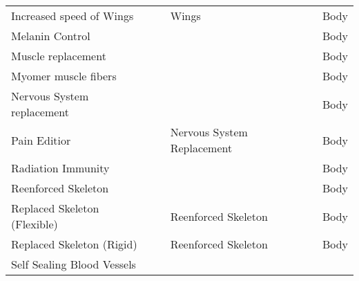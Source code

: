 \documentclass[twoside]{book}
\begin{document}
\begin{longtable}{p{1.25in}p{2em}ll}
  \raggedright
           Increased speed of Wings
           
  &
  
  &
   Wings 
  &
   Body 
  \tabularnewline
      
  \raggedright
           Melanin Control 
  &
  
  &
  
  &
   Body 
  \tabularnewline
      
  \raggedright
           Muscle replacement 
  &
  
  &
  
  &
   Body 
  \tabularnewline
      
  \raggedright
           Myomer muscle fibers 
  &
  
  &
  
  &
   Body 
  \tabularnewline
      
  \raggedright
           Nervous System replacement
           
  &
  
  &
  
  &
   Body 
  \tabularnewline
      
  \raggedright
           Pain Editior 
  &
  
  &
   Nervous System
           Replacement 
  &
   Body 
  \tabularnewline
      
  \raggedright
           Radiation Immunity 
  &
  
  &
  
  &
   Body 
  \tabularnewline
      
  \raggedright
           Reenforced Skeleton 
  &
  
  &
  
  &
   Body 
  \tabularnewline
      
  \raggedright
           Replaced Skeleton (Flexible)
           
  &
  
  &
   Reenforced Skeleton
           
  &
   Body 
  \tabularnewline
      
  \raggedright
           Replaced Skeleton (Rigid)
           
  &
  
  &
   Reenforced Skeleton
           
  &
   Body 
  \tabularnewline
      
  \raggedright
           Self Sealing Blood Vessels
           
  &
  
  &
  

\end{longtable}
\end{document}
